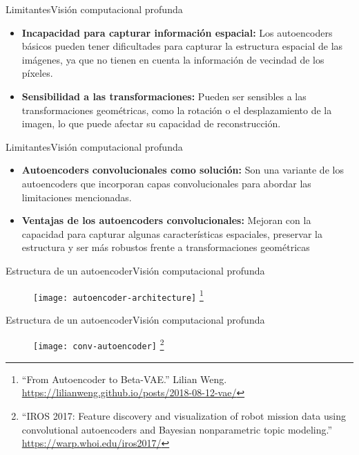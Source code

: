 \documentclass[10pt,border=3pt,tikz]{beamer}
\begin{document}
    \begin{frame}{Limitantes}{Visión computacional profunda}
        \begin{itemize}
            \item \textbf{Incapacidad para capturar información espacial:} Los autoencoders básicos pueden tener dificultades para capturar la estructura espacial de las imágenes, ya que no tienen en cuenta la información de vecindad de los píxeles.
            \item \textbf{Sensibilidad a las transformaciones:} Pueden ser sensibles a las transformaciones geométricas, como la rotación o el desplazamiento de la imagen, lo que puede afectar su capacidad de reconstrucción.
        \end{itemize}
    \end{frame}
    
    \begin{frame}{Limitantes}{Visión computacional profunda}
        \begin{itemize}
            \item \textbf{Autoencoders convolucionales como solución:} Son una variante de los autoencoders que incorporan capas convolucionales para abordar las limitaciones mencionadas.
            \item \textbf{Ventajas de los autoencoders convolucionales:} Mejoran con la capacidad para capturar algunas características espaciales, preservar la estructura y ser más robustos frente a transformaciones geométricas
        \end{itemize}
    \end{frame}
    
    \begin{frame}{Estructura de un autoencoder}{Visión computacional profunda}
        \begin{figure}
            \centering
            \texttt{[image: autoencoder-architecture]}
            \let\thefootnote\relax\footnote{{\tiny “From Autoencoder to Beta-VAE.” Lilian Weng. \url{https://lilianweng.github.io/posts/2018-08-12-vae/}}}
        \end{figure}
    \end{frame}
    
    \begin{frame}{Estructura de un autoencoder}{Visión computacional profunda}
        \begin{figure}
            \centering
            \texttt{[image: conv-autoencoder]}
            \let\thefootnote\relax\footnote{{\tiny “IROS 2017: Feature discovery and visualization of robot mission data using convolutional autoencoders and Bayesian nonparametric topic modeling.” \url{https://warp.whoi.edu/iros2017/}}}
        \end{figure}
    \end{frame}
    
\end{document}
